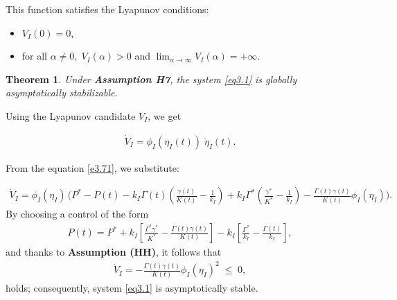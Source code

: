 \documentclass[10pt, a4paper]{amsart}
\makeatletter
\theoremstyle{plain}
\newtheorem{theorem}[lemma]{Theorem}
\theoremstyle{definition}
\theoremstyle{remark}
\renewenvironment{proof}[1][\proofname]{\par
  \pushQED{\qed}%
  \normalfont \topsep6\p@\@plus6\p@\relax
  \trivlist
  \item[\hskip\labelsep
        \itshape
    #1\ \ref{#1}.]\ignorespaces
}{%
  \popQED\endtrivlist\@endpefalse
}
\numberwithin{equation}{section}
\def\to{\rightarrow}
\makeatother
\begin{document}
 This function satisfies the Lyapunov conditions:
\begin{itemize}
 \item  $V_{I}(0)=0$,
 \item   for all $\alpha\neq0,\;V_{I}(\alpha)>0$ and $\lim_{\alpha\to\infty}V_{I}(\alpha)=+\infty$.
\end{itemize}
\begin{theorem}\label{th3.6}
 Under {\bf Assumption H7}, the system \eqref{eq3.1} is globally asymptotically stabilizable.
\end{theorem}
\begin{proof}[of Theorem \ref{th3.6}]
Using the Lyapunov candidate $V_{I}$, we get

\begin{align}\label{e3.73}
    \dot V_{I}
=\phi_{I}(\eta_{I}(t))\;\dot\eta_{I}(t).
\end{align}

From the equation \eqref{e3.71}, we substitute:

\begin{align}\label{e3.74}
    \dot V_{I}
= \phi_{I}(\eta_{I})\,\bigl(P^*-P(t)-k_I\Gamma(t)(\frac{\gamma(t)}{K(t)}-\frac{1}{k_I})+k_I\Gamma^*(\frac{\gamma^*}{K^*}-\frac{1}{k_I}) - \frac{\Gamma(t)\gamma(t)}{K(t)}\phi_{I}(\eta_{I})\bigr).
\end{align}
By choosing a control of the form
\begin{align}\label{e3.75}
    P(t)=P^*+k_I\left[\frac{\Gamma^*\gamma^*}{K^*}-\frac{\Gamma(t)\gamma(t)}{K(t)}\right]-k_I\left[\frac{\Gamma^*}{k_I}-\frac{\Gamma(t)}{k_I}\right],
\end{align}
and thanks to {\bf Assumption (HH)}, it follows that
\begin{align}\label{e3.76}
    \dot V_{I}
= -\frac{\Gamma(t)\gamma(t)}{K(t)}\phi_{I}(\eta_{I})^{2}
\;\le\;0,
\end{align}
holds; consequently, system \eqref{eq3.1}  is asymptotically stable.
\end{proof}
\end{document}
